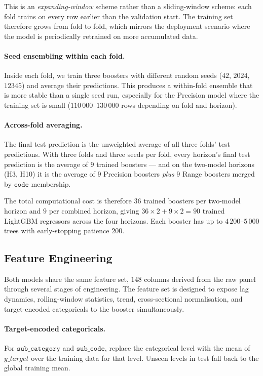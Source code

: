 This is an \emph{expanding-window} scheme rather than a sliding-window scheme: each fold trains on every row earlier than the validation start. The training set therefore grows from fold to fold, which mirrors the deployment scenario where the model is periodically retrained on more accumulated data.

\paragraph{Seed ensembling within each fold.}
Inside each fold, we train three boosters with different random seeds ($42$, $2024$, $12345$) and average their predictions. This produces a within-fold ensemble that is more stable than a single seed run, especially for the Precision model where the training set is small ($110\,000$--$130\,000$ rows depending on fold and horizon).

\paragraph{Across-fold averaging.}
The final test prediction is the unweighted average of all three folds' test predictions. With three folds and three seeds per fold, every horizon's final test prediction is the average of $9$ trained boosters --- and on the two-model horizons (H3, H10) it is the average of $9$ Precision boosters \emph{plus} $9$ Range boosters merged by $\mathtt{code}$ membership.

The total computational cost is therefore $36$ trained boosters per two-model horizon and $9$ per combined horizon, giving $36 \times 2 + 9 \times 2 = 90$ trained LightGBM regressors across the four horizons. Each booster has up to $4\,200$--$5\,000$ trees with early-stopping patience $200$.

\subsection{Feature Engineering}
\label{sec:two_model:features}

Both models share the same feature set, $148$ columns derived from the raw panel through several stages of engineering. The feature set is designed to expose lag dynamics, rolling-window statistics, trend, cross-sectional normalisation, and target-encoded categoricals to the booster simultaneously.

\paragraph{Target-encoded categoricals.}
For $\mathtt{sub\_category}$ and $\mathtt{sub\_code}$, replace the categorical level with the mean of $y\_target$ over the training data for that level. Unseen levels in test fall back to the global training mean.

